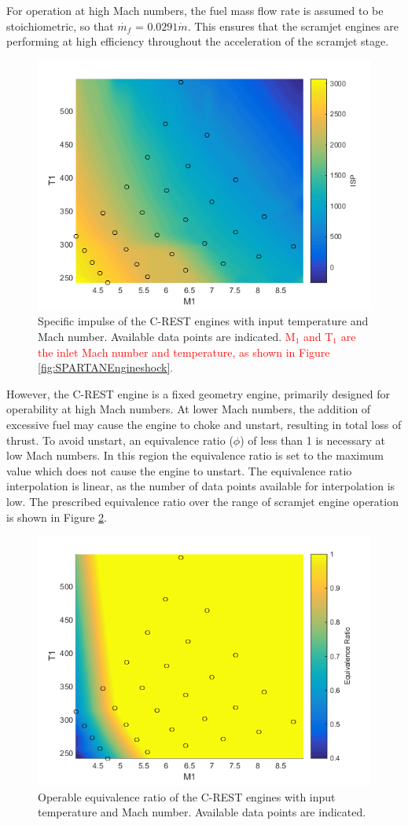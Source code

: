 For operation at high Mach numbers, the fuel mass flow rate is assumed to be stoichiometric, so that $\dot{m_f}$ = $0.0291\dot{m}$. This ensures that the scramjet engines are performing at high efficiency throughout the acceleration of the scramjet stage. 
\begin{figure}[ht]
	\centering
	\includegraphics[width=0.6\linewidth]{figures/3_vehicle_design/ISPinterp}
	\caption{Specific impulse of the C-REST engines with input temperature and Mach number. Available data points are indicated. \textcolor{red}{M$_1$ and T$_1$ are the inlet Mach number and temperature, as shown in Figure \ref{fig:SPARTANEngineshock}.}}
	\label{fig:ISPinterp}
\end{figure}
However, the C-REST engine is a fixed geometry engine, primarily designed for operability at high Mach numbers\cite{Preller2017b}. At lower Mach numbers, the addition of excessive fuel may cause the engine to choke and unstart, resulting in total loss of thrust\cite{Preller2017b}. To avoid unstart, an equivalence ratio ($\phi$) of less than 1 is necessary at low Mach numbers. In this region the equivalence ratio is set to the maximum value which does not cause the engine to unstart. The equivalence ratio interpolation is linear, as the number of data points available for interpolation is low. The prescribed equivalence ratio over the range of scramjet engine operation is shown in Figure \ref{fig:EquivalenceRatioInterp}.
\begin{figure}[ht]
	\centering
	\includegraphics[width=0.6\linewidth]{figures/3_vehicle_design/EquivalenceRatioInterp}
	\caption{Operable equivalence ratio of the C-REST engines with input temperature and Mach number. Available data points are indicated.}
	\label{fig:EquivalenceRatioInterp}
\end{figure}

